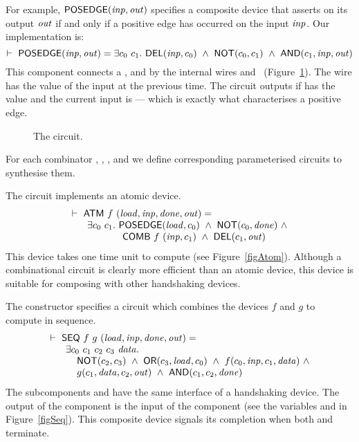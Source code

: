 \documentclass{llncs}
\begin{document}
For example, $\mathsf{POSEDGE}(\mathit{inp},\mathit{out})$ specifies a composite
device that asserts  on its output $\mathit{out}$ if and only if a positive edge
has occurred on the input $\mathit{inp}$. Our implementation is:
\[
\TURNST\ \DEF{POSEDGE} (\VAR{inp},\VAR{out}) = 
    \exists c_0~ c_1.\ \DEF{DEL} (\VAR{inp},c_0)\ \AND\
                  \DEF{NOT} (c_0, c_1)\ \AND\ \DEF{AND} (c_1,\VAR{inp},\VAR{out})
\]
This component connects a ,  and 
by the internal wires  and~ (Figure~\ref{figPosedge}).
The wire  has the value of the
input at the previous time. The circuit outputs  if
\sVAR{c}{0} has the value  and the current input is  ---
which is exactly what characterises a positive edge.
\begin{figure}[htb]
   \centerline{}
   \caption{\label{figPosedge}The  circuit.}
\end{figure}



For each combinator , , ,
 and  we define corresponding
parameterised circuits to synthesise them.

The circuit  implements an atomic device.
\[
\begin{array}{l}
\TURNST\ \DEF{ATM}\ f\ (\VAR{load,inp,done,out}) =\\
\phantom{\TURNST\ ~~}    \exists c_0~ c_1.\ \DEF{POSEDGE} (\VAR{load}, c_0)\ \AND \ 
\DEF{NOT} (c_0, \VAR{done})\ \AND\\
\phantom{\TURNST\ ~~\exists c_0, c_1.\ }  \DEF{COMB}\ f\ (\VAR{inp},c_1)\ \AND\ \DEF{DEL} (c_1,\VAR{out})
\end{array}
\]
This device takes one time unit to compute (see Figure~\ref{figAtom}).
Although a combinational circuit is 
clearly more efficient than an atomic device,
this device is suitable for composing with other
handshaking devices.

The constructor  specifies a circuit which combines
the devices $f$ and $g$ to compute in sequence.
\[
\begin{array}{l}
\TURNST\ \DEF{SEQ}\ f\ g\ (\VAR{load,inp,done,out}) = \\
\phantom{\TURNST\ ~~} \exists c_0~ c_1~ c_2~ c_3~ \VAR{data}.\\
\phantom{\TURNST\ ~~\exists~}                      \DEF{NOT} (c_2,c_3) \ \AND \ 
                      \DEF{OR} (c_3,\VAR{load},c_0) \ \AND \  f (c_0,\VAR{inp},c_1,\VAR{data}) \ \AND \\
\phantom{\TURNST\ ~~ \exists~} 
        g (c_1,\VAR{data},c_2,\VAR{out})\ \AND\ 
        \DEF{AND} (c_1,c_2,\VAR{done}) 
\end{array}
\]
The subcomponents  and  have the same interface of
a handshaking device. The output of the component \VAR{f} 
is the input of the component \VAR{g} (see the
variables  and  in Figure~\ref{figSeq}).
This composite device signals its completion when both \VAR{f} and 
\VAR{g} terminate.
\end{document}
